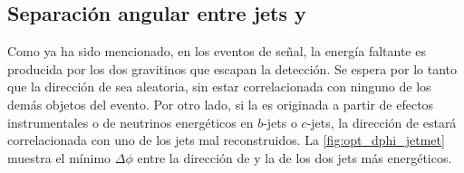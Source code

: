 



\subsection{Separación angular entre jets y \met}
\label{sec:dphi_obj}

Como ya ha sido mencionado, en los eventos de señal, la energía faltante es producida por los dos
gravitinos que escapan la detección. Se espera por lo tanto que la dirección de {\met} sea aleatoria,
sin estar correlacionada con ninguno de los demás objetos del evento. Por otro
lado, si la {\met} es originada a partir de efectos instrumentales o de neutrinos
energéticos en $b$-jets o $c$-jets, la dirección de {\met} estará
correlacionada con uno de los jets mal reconstruidos. La
\cref{fig:opt_dphi_jetmet} muestra el mínimo $\Delta\phi$ entre la dirección
de {\met} y la de los dos jets más energéticos.



